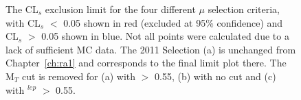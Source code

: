 \begin{figure}[htbp]
\centering
{}
\caption{\label{fig:4fit}The CL$_{s}$ exclusion limit for the four different $\mu$ selection criteria, with CL$_{s}$ $<$ 0.05 shown in red (excluded at 95\% confidence) and CL$_{s}$ $>$ 0.05 shown in blue. Not all points were calculated due to a lack of sufficient MC data. The 2011 Selection (a) is unchanged from Chapter~\ref{ch:ra1} and corresponds to the final limit plot there. The M$_{T}$ cut is removed for (a) with \alt $>$ 0.55, (b) with no \alt cut and (c) with \alt$^{lep}$ $>$ 0.55.}
\end{figure}



